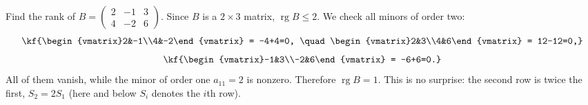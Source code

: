 \begin{misol}
Find the rank of $B=\begin{pmatrix}2 & -1 & 3\\ 4 & -2 & 6\end{pmatrix}$.
Since $B$ is a $2\times 3$ matrix, $\operatorname{rg}B \leq 2$. We check all
minors of order two:
\[\kf{\begin{vmatrix}2&-1\\4&-2\end{vmatrix} = -4+4=0, \quad
\begin{vmatrix}2&3\\4&6\end{vmatrix} = 12-12=0,}\]
\[\kf{\begin{vmatrix}-1&3\\-2&6\end{vmatrix} = -6+6=0.}\]
All of them vanish, while the minor of order one $a_{11}=2$ is nonzero.
Therefore $\operatorname{rg}B = 1$. This is no surprise: the second row is
twice the first, $S_2 = 2S_1$ (here and below $S_i$ denotes the $i$th row).
\end{misol}
\bigskip

